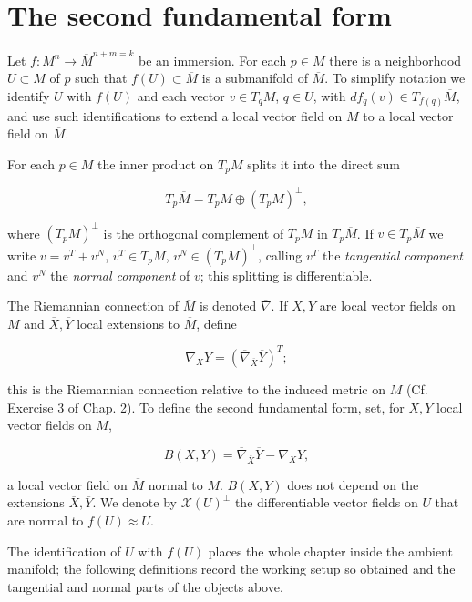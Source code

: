 \section{The second fundamental form}

Let $f:M^n\to\overline{M}^{n+m=k}$ be an immersion. For each $p\in M$ there is a
neighborhood $U\subset M$ of $p$ such that $f(U)\subset\overline{M}$ is a
submanifold of $\overline{M}$. To simplify notation we identify $U$ with $f(U)$
and each vector $v\in T_qM$, $q\in U$, with $df_q(v)\in T_{f(q)}\overline{M}$, and
use such identifications to extend a local vector field on $M$ to a local vector
field on $\overline{M}$.

For each $p\in M$ the inner product on $T_p\overline{M}$ splits it into the direct
sum

$$
T_p\overline{M}=T_pM\oplus(T_pM)^\perp,
$$

where $(T_pM)^\perp$ is the orthogonal complement of $T_pM$ in $T_p\overline{M}$.
If $v\in T_p\overline{M}$ we write $v=v^T+v^N$, $v^T\in T_pM$,
$v^N\in(T_pM)^\perp$, calling $v^T$ the \emph{tangential component} and $v^N$ the
\emph{normal component} of $v$; this splitting is differentiable.

The Riemannian connection of $\overline{M}$ is denoted $\overline{\nabla}$. If
$X,Y$ are local vector fields on $M$ and $\overline{X},\overline{Y}$ local
extensions to $\overline{M}$, define

$$
\nabla_X Y=(\overline{\nabla}_{\overline{X}}\overline{Y})^T;
$$

this is the Riemannian connection relative to the induced metric on $M$
(Cf. Exercise 3 of Chap. 2). To define the second fundamental form, set, for $X,Y$
local vector fields on $M$,

$$
B(X,Y)=\overline{\nabla}_{\overline{X}}\overline{Y}-\nabla_X Y,
$$

a local vector field on $\overline{M}$ normal to $M$. $B(X,Y)$ does not depend on
the extensions $\overline{X},\overline{Y}$. We denote by $\mathcal{X}(U)^\perp$ the
differentiable vector fields on $U$ that are normal to $f(U)\approx U$.

The identification of $U$ with $f(U)$ places the whole chapter inside the
ambient manifold; the following definitions record the working setup so
obtained and the tangential and normal parts of the objects above.


